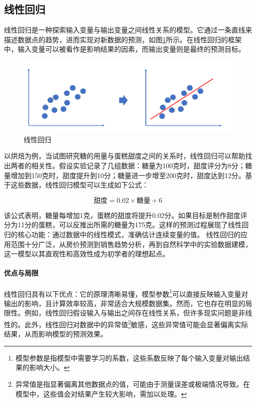 \subsection{线性回归}

线性回归是一种探索输入变量与输出变量之间线性关系的模型。它通过一条直线来描述数据点的趋势，进而实现对新数据的预测，如图\ref{fig:线性回归}所示。在线性回归的框架中，输入变量可以被看作是影响结果的因素，而输出变量则是最终的预测目标。

\begin{figure}[H]
    \centering
    \includegraphics[width=0.8\linewidth]{image/2/线性回归.png}
    \caption{线性回归}
    \label{fig:线性回归}
\end{figure}
以烘焙为例，当试图研究糖的用量与蛋糕甜度之间的关系时，线性回归可以帮助找出两者的相关性。假设实验记录了几组数据：糖量为100克时，甜度评分为8分；糖量增加到150克时，甜度提升到10分；糖量进一步增至200克时，甜度达到12分。基于这些数据，线性回归模型可以生成如下公式：

\[
\text{甜度} = 0.02 \times \text{糖量} + 6
\]

该公式表明，糖量每增加1克，蛋糕的甜度将提升0.02分。如果目标是制作甜度评分为11分的蛋糕，可以反推出所需的糖量为175克。这样的预测过程展现了线性回归的核心功能：通过数据中的线性模式，准确估计连续变量的值。
线性回归的应用范围十分广泛，从房价预测到销售趋势分析，再到自然科学中的实验数据建模，这一模型以其直观性和高效性成为初学者的理想起点。

\paragraph{优点与局限}  

线性回归具有以下优点：它的原理清晰易懂，模型参数\footnote{模型参数是指模型中需要学习的系数，这些系数反映了每个输入变量对输出结果的影响大小。}可以直接反映输入变量对输出的影响，且计算效率较高，非常适合大规模数据集。然而，它也存在明显的局限性。例如，线性回归假设输入与输出之间存在线性关系，但许多现实问题是非线性的。此外，线性回归对数据中的异常值\footnote{异常值是指显著偏离其他数据点的值，可能由于测量误差或极端情况导致。在模型中，这些值会对结果产生较大影响，需加以处理。}敏感，这些异常值可能会显著偏离实际结果，从而影响模型的预测效果。

